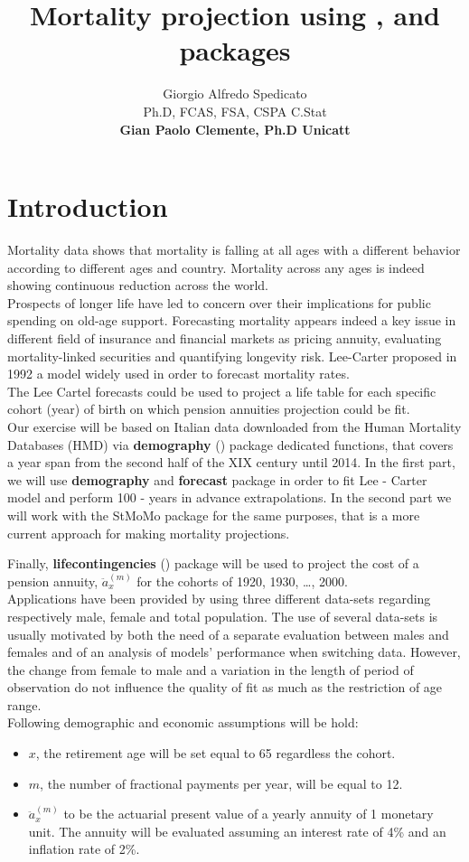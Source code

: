 \documentclass[nojss]{jss}
\author{Giorgio Alfredo Spedicato\\ Ph.D, FCAS, FSA, CSPA C.Stat \\ 
        \textbf{Gian Paolo Clemente, Ph.D Unicatt}}
\title{Mortality projection using \pkg{lifecontingencies}, \pkg{demography} and \pkg{StMoMo}
packages}
\begin{document}
\section{Introduction}
Mortality data shows that mortality is falling at all ages with a different behavior according to different ages and country.
Mortality across any ages is indeed showing continuous reduction across the world. \\ 
Prospects of longer life have led to concern over their implications for public spending on old-age support. Forecasting mortality appears indeed a key issue in different field of insurance and financial markets as pricing annuity, evaluating mortality-linked securities and quantifying longevity risk. Lee-Carter proposed in 1992 a model widely used in order to forecast mortality rates.\\
The Lee Cartel forecasts could be used to project a life table for each specific cohort (year) of birth on which pension annuities projection could be fit.\\

Our exercise will be based on Italian data downloaded from the Human Mortality Databases (HMD) via \textbf{demography} (\cite{demographyR}) package dedicated functions, that covers a year span from the second half of the XIX century until 2014. In the first part, we will use \textbf{demography} and \textbf{forecast} package in order to fit Lee - Carter model and perform 100 - years in advance extrapolations.
In the second part we will work with the StMoMo package \cite{pkg:StMoMo} for the same purposes, that is a more current approach for making mortality projections. 

Finally, \textbf{lifecontingencies} (\cite{spedLifecon}) package will be used to project the cost of a pension annuity, $\ddot{a}_{x}^{(m)}$ for the cohorts of 1920, 1930, \ldots,
2000. \\ 
Applications have been provided by using three different data-sets regarding respectively male, female and total population.
The use of several data-sets is usually motivated by both the need of a separate evaluation between males and females and of an analysis of models' performance when switching data. However, the change from female to male and a variation in the length of period of observation do not influence the quality of fit as much as the restriction of age range.\\

Following demographic and economic assumptions will be hold:
\begin{itemize}
  \item $x$, the retirement age will be set equal to 65 regardless the cohort.
  \item $m$, the number of fractional payments per year, will be equal to 12.
  \item $\ddot{a}_{x}^{(m)}$ to be the actuarial present value of a yearly annuity of 1 monetary unit. The annuity will be evaluated assuming an interest rate of 4\% and an inflation rate of 2\%.
\end{itemize}
\end{document}
